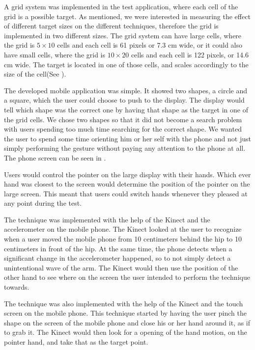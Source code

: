 A grid system was implemented in the test application, where each cell of the grid is a possible target. 
As mentioned, we were interested in measuring the effect of different target sizes on the different techniques, therefore the grid is implemented in two different sizes. 
The grid system can have large cells, where the grid is $5 \times 10$ cells and each cell is 61 pixels or 7.3 cm wide, or it could also have small cells, where the grid is $10 \times 20$ cells and each cell is 122 pixels, or 14.6 cm wide. 
The target is located in one of those cells, and scales accordingly to the size of the cell(See ).

The developed mobile application was simple. It showed two shapes, a circle and a square, which the user could choose to push to the display. The display would tell which shape was the correct one by having that shape as the target in one of the grid cells. We chose two shapes so that it did not become a search problem with users spending too much time searching for the correct shape. We wanted the user to spend some time orienting him or her self with the phone and not just simply performing the gesture without paying any attention to the phone at all. The phone screen can be seen in .

Users would control the pointer on the large display with their hands. 
Which ever hand was closest to the screen would determine the position of the pointer on the large screen. 
This meant that users could switch hands whenever they pleased at any point during the test. 

The \throw technique was implemented with the help of the Kinect and the accelerometer on the mobile phone. 
The Kinect looked at the user to recognize when a user moved the mobile phone from 10 centimeters behind the hip to 10 centimeters in front of the hip. 
At the same time, the phone detects when a significant change in the accelerometer happened, so to not simply detect a unintentional wave of the arm. 
The Kinect would then use the position of the other hand to see where on the screen the user intended to perform the \throw technique towards. 

The \pinch technique was also implemented with the help of the Kinect and the touch screen on the mobile phone. 
This technique started by having the user pinch the shape on the screen of the mobile phone and close his or her hand around it, as if to grab it. 
The Kinect would then look for a opening of the hand motion, on the pointer hand, and take that as the target point.

